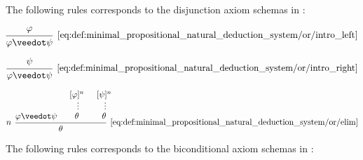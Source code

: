 \begin{definition}
\begin{thmenum}
     The following rules corresponds to the disjunction axiom schemas in :

    \begin{minipage}{0.3\textwidth}
      \begin{equation*}\taglabel[\( \vee^{+_L} \)]{eq:def:minimal_propositional_natural_deduction_system/or/intro_left}
        \begin{prooftree}
          \hypo{ \varphi }
          \infer1[\ref{eq:def:minimal_propositional_natural_deduction_system/or/intro_left}]{ \varphi \synvee \psi }
        \end{prooftree}
      \end{equation*}
    \end{minipage}
    \hfill
    \begin{minipage}{0.3\textwidth}
      \begin{equation*}\taglabel[\( \vee^{+_R} \)]{eq:def:minimal_propositional_natural_deduction_system/or/intro_right}
        \begin{prooftree}
          \hypo{ \psi }
          \infer1[\ref{eq:def:minimal_propositional_natural_deduction_system/or/intro_right}]{ \varphi \synvee \psi }
        \end{prooftree}
      \end{equation*}
    \end{minipage}
    \hfill
    \begin{minipage}{0.3\textwidth}
      \begin{equation*}\taglabel[\( \vee^- \)]{eq:def:minimal_propositional_natural_deduction_system/or/elim}
        \begin{prooftree}
          \hypo{ \varphi \synvee \psi }
          \hypo{ [\varphi]^n }
          \ellipsis {} { \theta }
          \hypo{ [\psi]^n }
          \ellipsis {} { \theta }
          \infer[left label=\( n \)]3[\ref{eq:def:minimal_propositional_natural_deduction_system/or/elim}]{ \theta }
        \end{prooftree}
      \end{equation*}
    \end{minipage}

     The following rules corresponds to the biconditional axiom schemas in :


\end{thmenum}
\end{definition}
